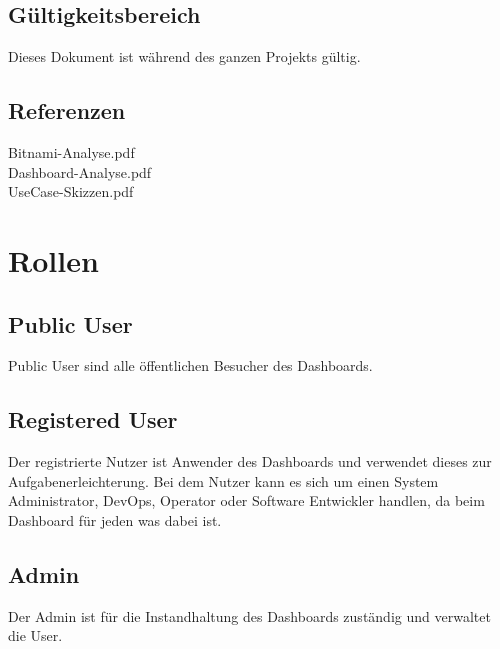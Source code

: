 \documentclass[11pt]{scrartcl}
\begin{document}
\subsection{Gültigkeitsbereich}

Dieses Dokument ist während des ganzen Projekts gültig.

\subsection{Referenzen}
Bitnami-Analyse.pdf\\
Dashboard-Analyse.pdf\\
UseCase-Skizzen.pdf

\section{Rollen}
\subsection{Public User}
Public User sind alle öffentlichen Besucher des Dashboards.

\subsection{Registered User}
Der registrierte Nutzer ist Anwender des Dashboards und verwendet dieses zur 
Aufgabenerleichterung.
Bei dem Nutzer kann es sich um einen System Administrator, DevOps, Operator oder
Software Entwickler handlen, da beim Dashboard für jeden was dabei ist.

\subsection{Admin}
Der Admin ist für die Instandhaltung des Dashboards zuständig und verwaltet die 
User.
\end{document}

